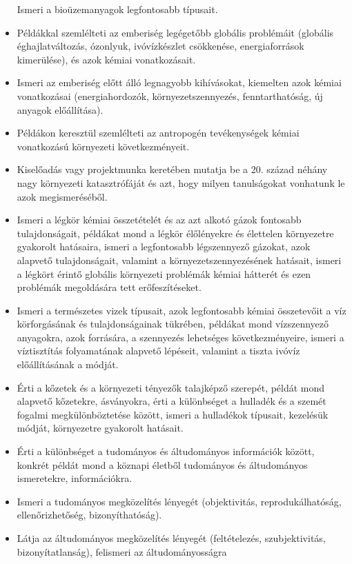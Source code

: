 \begin{itemize}
  Ismeri a bioüzemanyagok legfontosabb típusait.
\item
  Példákkal szemlélteti az emberiség legégetőbb globális problémáit
  (globális éghajlatváltozás, ózonlyuk, ivóvízkészlet csökkenése,
  energiaforrások kimerülése), és azok kémiai vonatkozásait.
\item
  Ismeri az emberiség előtt álló legnagyobb kihívásokat, kiemelten azok
  kémiai vonatkozásai (energiahordozók, környezetszennyezés,
  fenntarthatóság, új anyagok előállítása).
\item
  Példákon keresztül szemlélteti az antropogén tevékenységek kémiai
  vonatkozású környezeti következményeit.
\item
  Kiselőadás vagy projektmunka keretében mutatja be a 20. század néhány
  nagy környezeti katasztrófáját és azt, hogy milyen tanulságokat
  vonhatunk le azok megismeréséből.
\item
  Ismeri a légkör kémiai összetételét és az azt alkotó gázok fontosabb
  tulajdonságait, példákat mond a légkör élőlényekre és élettelen
  környezetre gyakorolt hatásaira, ismeri a legfontosabb légszennyező
  gázokat, azok alapvető tulajdonságait, valamint a
  környezetszennyezésének hatásait, ismeri a légkört érintő globális
  környezeti problémák kémiai hátterét és ezen problémák megoldására
  tett erőfeszítéseket.
\item
  Ismeri a természetes vizek típusait, azok legfontosabb kémiai
  összetevőit a víz körforgásának és tulajdonságainak tükrében, példákat
  mond vízszennyező anyagokra, azok forrására, a szennyezés lehetséges
  következményeire, ismeri a víztisztítás folyamatának alapvető
  lépéseit, valamint a tiszta ivóvíz előállításának a módját.
\item
  Érti a kőzetek és a környezeti tényezők talajképző szerepét, példát
  mond alapvető kőzetekre, ásványokra, érti a különbséget a hulladék és
  a szemét fogalmi megkülönböztetése között, ismeri a hulladékok
  típusait, kezelésük módját, környezetre gyakorolt hatásait.
\item
  Érti a különbséget a tudományos és áltudományos információk között,
  konkrét példát mond a köznapi életből tudományos és áltudományos
  ismeretekre, információkra.
\item
  Ismeri a tudományos megközelítés lényegét (objektivitás,
  reprodukálhatóság, ellenőrizhetőség, bizonyíthatóság).
\item
  Látja az áltudományos megközelítés lényegét (feltételezés,
  szubjektivitás, bizonyítatlanság), felismeri az áltudományosságra

\end{itemize}
